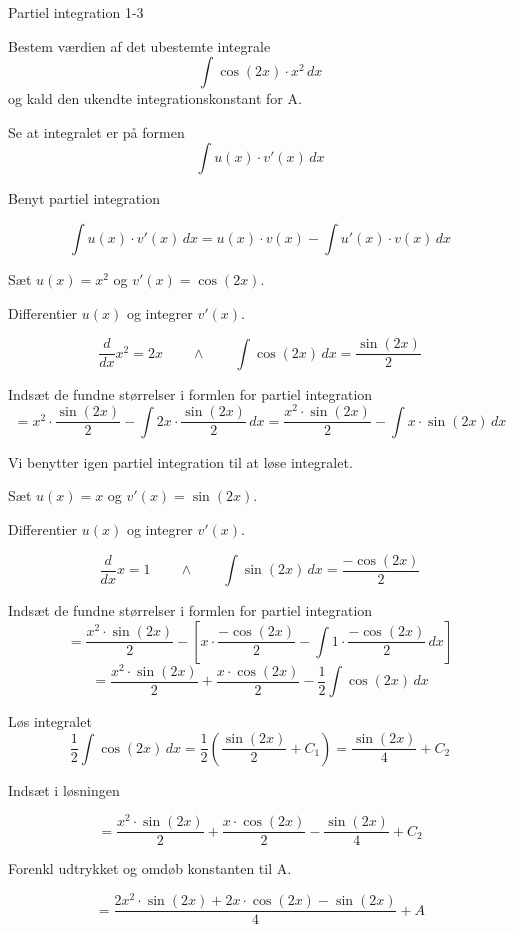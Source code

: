 \documentclass{article}
\begin{document}
\newpage

\begin{exercise}{Partiel integration 1-3}
	
	
	Bestem værdien af det ubestemte integrale
	\[
	\int \cos(2x) \cdot x^2 \, dx
	\]
	og kald den ukendte integrationskonstant for A.
	
	
	
	\hint
	
	Se at integralet er på formen
	\[
	\int u(x) \cdot v'(x) \, dx
	\]
	
	\hint
	
	Benyt partiel integration
	
	\hint
	\[
	\int u(x) \cdot v'(x)\, dx = u(x) \cdot v(x) - \int u'(x) \cdot v(x) \, dx
	\]
	\hint
	
	Sæt $u(x) = x^2$ og $v'(x) = \cos(2x)$.
	
	
	\hint
	
	Differentier $u(x)$ og integrer $v'(x)$.
	
	\hint
	\[
	\frac{d}{dx}x^2 = 2x \qquad \wedge \qquad \int \cos(2x) \, dx = \frac{\sin(2x)}{2}
	\]
	
	\hint
	
	Indsæt de fundne størrelser i formlen for partiel integration
	\[
	= x^2 \cdot  \frac{\sin(2x)}{2} - \int 2x \cdot  \frac{\sin(2x)}{2} \, dx = \frac{x^2 \cdot \sin(2x)}{2} - \int x \cdot \sin(2x) \, dx 
	\]
	
	\hint
	
	Vi benytter igen partiel integration til at løse integralet.
	
	\hint
	
	Sæt $u(x) = x$ og $v'(x) = \sin(2x)$.
	
	
	\hint
	
	Differentier $u(x)$ og integrer $v'(x)$.
	
	\hint
	\[
	\frac{d}{dx}x = 1 \qquad \wedge \qquad \int \sin(2x) \, dx = \frac{-\cos(2x)}{2}
	\]
	
	\hint
	
	Indsæt de fundne størrelser i formlen for partiel integration
	\[
	= \frac{x^2 \cdot \sin(2x)}{2} - \left[ x \cdot \frac{-\cos(2x)}{2} - \int 1 \cdot \frac{-\cos(2x)}{2} \, dx \right] 
	\]
	\[ 
	= \frac{x^2 \cdot \sin(2x)}{2} +  \frac{x \cdot \cos(2x)}{2} -  \frac{1}{2}\int \cos(2x)\, dx
	\]
	
	\hint
	Løs integralet
	\[
	\frac{1}{2} \int \cos(2x) \, dx = \frac{1}{2} \left(\frac{\sin(2x)}{2} + C_1\right) = \frac{\sin(2x)}{4} + C_2
	\]
	
	\hint
	Indsæt i løsningen 
	
	\hint
	
	\[
	= \frac{x^2 \cdot \sin(2x)}{2} +  \frac{x \cdot \cos(2x)}{2} - \frac{\sin(2x)}{4} + C_2
	\]
	
	\hint
	
	Forenkl udtrykket og omdøb konstanten til A.
	
	\hint
	
	\[
	=  \frac{2x^2 \cdot \sin(2x)+2x\cdot \cos(2x) -  \sin(2x)}{4} +  A
	\]
	
	
\end{exercise}
\end{document}
